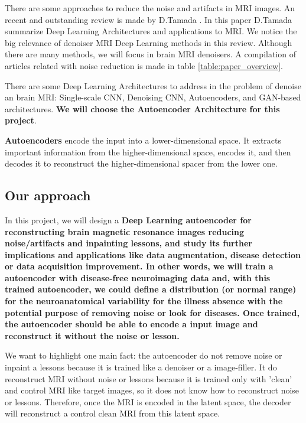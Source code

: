 There are some approaches to reduce the noise and artifacts in MRI images. An recent and outstanding review is made by D.Tamada \cite{tamada2020review}. In this paper D.Tamada summarize Deep Learning Architectures and applications to MRI. We notice the big relevance of denoiser MRI Deep Learning methods in this review. Although there are many methods, we will focus in brain MRI denoisers. A compilation of articles related with noise reduction is made in table \ref{table:paper_overview}.

There are some Deep Learning Architectures to address in the problem of denoise an brain MRI: Single-scale CNN, Denoising CNN, Autoencoders, and GAN-based architectures. \textbf{We will choose the Autoencoder Architecture for this project}.

\textbf{Autoencoders} \cite{autoencoder} encode the input into a lower-dimensional space. It extracts important information from the higher-dimensional space, encodes it, and then decodes it to reconstruct the higher-dimensional spacer from the lower one. 



\subsection{Our approach}

\begin{tcolorbox}
In this project, we will design a \textbf{Deep Learning autoencoder for reconstructing brain magnetic resonance images reducing noise/artifacts and inpainting lessons, and study its further implications and applications like  data augmentation, disease detection or data acquisition improvement. In other words, we will train a autoencoder with disease-free neuroimaging data and, with this trained autoencoder, we could define a distribution (or normal range) for the neuroanatomical variability for the illness absence with the potential purpose of removing noise or look for diseases. Once trained, the autoencoder should be able to encode a input image and reconstruct it without the noise or lesson.}
\end{tcolorbox}

We want to highlight one main fact: the autoencoder do not remove noise or inpaint a lessons because it is trained like a denoiser or a image-filler. It do reconstruct MRI without noise or lessons because it is trained only with 'clean' and control MRI like target images, so it does not know how to reconstruct noise or lessons. Therefore, once the MRI is encoded in the latent space, the decoder will reconstruct a control clean MRI from this latent space.

